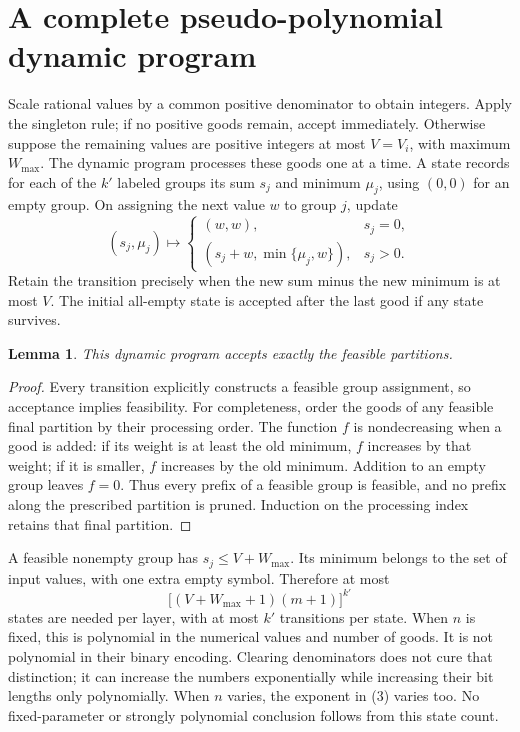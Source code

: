 \documentclass[11pt]{article}
\newtheorem{lemma}{Lemma}
\begin{document}
\section*{A complete pseudo-polynomial dynamic program}
Scale rational values by a common positive denominator to obtain integers.
Apply the singleton rule; if no positive goods remain, accept immediately.
Otherwise suppose the remaining values are positive
integers at most $V=V_i$, with maximum $W_{\max}$. The dynamic program
processes these goods one at a time. A state records for each of the $k'$
labeled groups its sum $s_j$ and minimum $\mu_j$, using $(0,0)$ for an empty
group. On assigning the next value $w$ to group $j$, update
\[
 (s_j,\mu_j)\longmapsto
 \begin{cases}
 (w,w),&s_j=0,\\
 (s_j+w,\min\{\mu_j,w\}),&s_j>0.
 \end{cases}
\]
Retain the transition precisely when the new sum minus the new minimum
is at most $V$. The initial all-empty state is accepted after the last
good if any state survives.

\begin{lemma}
This dynamic program accepts exactly the feasible partitions.
\end{lemma}
\begin{proof}
Every transition explicitly constructs a feasible group assignment, so
acceptance implies feasibility. For completeness, order the goods of any
feasible final partition by their processing order. The function $f$ is
nondecreasing when a good is added: if its weight is at least the old minimum,
$f$ increases by that weight; if it is smaller, $f$ increases by the old
minimum. Addition to an empty group leaves $f=0$. Thus every prefix of a
feasible group is feasible, and no prefix along the prescribed partition
is pruned. Induction on the processing index retains that final partition.
\end{proof}

A feasible nonempty group has $s_j\leq V+W_{\max}$. Its minimum belongs to
the set of input values, with one extra empty symbol. Therefore at most
\[
       \bigl[(V+W_{\max}+1)(m+1)\bigr]^{k'}           \tag{3}
\]
states are needed per layer, with at most $k'$ transitions per state.
When $n$ is fixed, this is polynomial in the numerical values and number
of goods. It is not polynomial in their binary encoding. Clearing
denominators does not cure that distinction; it can increase the numbers
exponentially while increasing their bit lengths only polynomially.
When $n$ varies, the exponent in (3) varies too. No fixed-parameter or
strongly polynomial conclusion follows from this state count.
\end{document}
